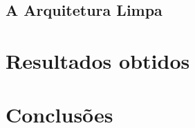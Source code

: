 \documentclass[12pt]{article}
\begin{document}


\subsection{A Arquitetura Limpa}




\section{Resultados obtidos}




\section{Conclusões}






\end{document}
